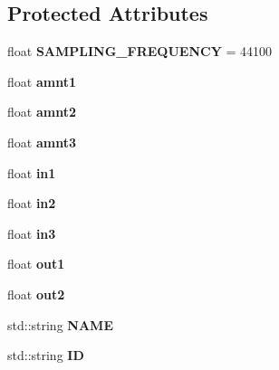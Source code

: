 \subsection*{Protected Attributes}
\begin{DoxyCompactItemize}
\item 
\hypertarget{classunit_1_1UGen_af570ad383b680b2c79209b6ab28d010d}{float {\bfseries S\-A\-M\-P\-L\-I\-N\-G\-\_\-\-F\-R\-E\-Q\-U\-E\-N\-C\-Y} = 44100}\label{classunit_1_1UGen_af570ad383b680b2c79209b6ab28d010d}

\item 
\hypertarget{classunit_1_1UGen_a4691cf88e3711c22617c11fc3ea3848e}{float {\bfseries amnt1}}\label{classunit_1_1UGen_a4691cf88e3711c22617c11fc3ea3848e}

\item 
\hypertarget{classunit_1_1UGen_a5e71a2e764029b4909c7e8535922e4b3}{float {\bfseries amnt2}}\label{classunit_1_1UGen_a5e71a2e764029b4909c7e8535922e4b3}

\item 
\hypertarget{classunit_1_1UGen_a14ebb8261a700f961c2d7808609470fe}{float {\bfseries amnt3}}\label{classunit_1_1UGen_a14ebb8261a700f961c2d7808609470fe}

\item 
\hypertarget{classunit_1_1UGen_aaf1873ae9668c6f1b37cae635bd40037}{float {\bfseries in1}}\label{classunit_1_1UGen_aaf1873ae9668c6f1b37cae635bd40037}

\item 
\hypertarget{classunit_1_1UGen_aed559bb431c46fe308560bd81756d169}{float {\bfseries in2}}\label{classunit_1_1UGen_aed559bb431c46fe308560bd81756d169}

\item 
\hypertarget{classunit_1_1UGen_aa774e90c8fc597e3eb84889632cf23df}{float {\bfseries in3}}\label{classunit_1_1UGen_aa774e90c8fc597e3eb84889632cf23df}

\item 
\hypertarget{classunit_1_1UGen_a90ba3b9008a6d8386035db3dee502217}{float {\bfseries out1}}\label{classunit_1_1UGen_a90ba3b9008a6d8386035db3dee502217}

\item 
\hypertarget{classunit_1_1UGen_a779961bf3971a9f4c85d292dbb6d6d78}{float {\bfseries out2}}\label{classunit_1_1UGen_a779961bf3971a9f4c85d292dbb6d6d78}

\item 
\hypertarget{classunit_1_1UGen_ae468f7e763da88da4389b8bdbc306459}{std\-::string {\bfseries N\-A\-M\-E}}\label{classunit_1_1UGen_ae468f7e763da88da4389b8bdbc306459}

\item 
\hypertarget{classunit_1_1UGen_ab8d5acd179e175cc787ac43a49b68c29}{std\-::string {\bfseries I\-D}}\label{classunit_1_1UGen_ab8d5acd179e175cc787ac43a49b68c29}

\end{DoxyCompactItemize}


